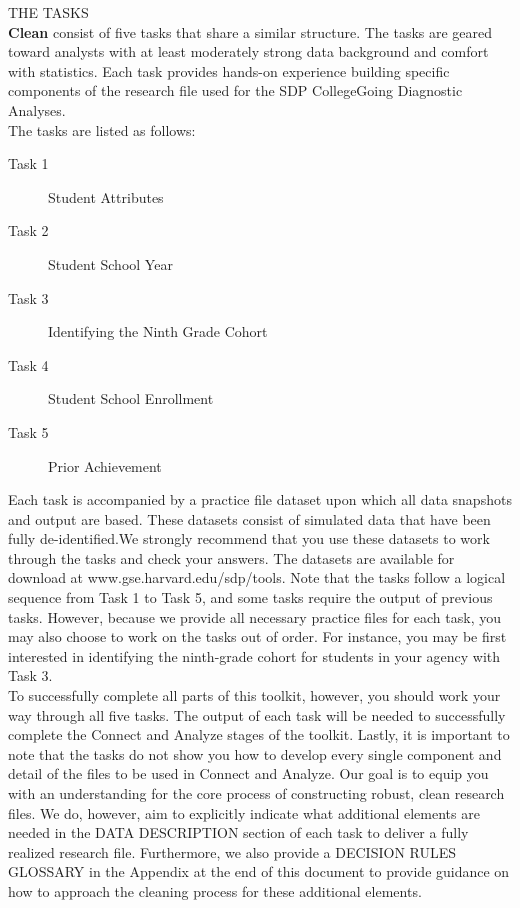 \documentclass[12pt]{article}
\begin{document}
\noindent \large{THE TASKS} \\
\normalsize
\textbf{Clean} consist of five tasks that share a similar structure.  The tasks are geared toward analysts with at least moderately 
strong data background and comfort with statistics.  Each task provides hands-on experience building specific 
components of the research file used for the SDP CollegeGoing Diagnostic Analyses.  \\
\vspace{-6pt}
\noindent The tasks are listed as follows:
\begin{description}
\item [Task 1] Student Attributes
\item [Task 2] Student School Year
\item [Task 3] Identifying the Ninth Grade Cohort
\item [Task 4] Student School Enrollment
\item [Task 5] Prior Achievement
\end{description}

Each task is accompanied by a practice file dataset upon which all data snapshots and output are based. These datasets consist of simulated data that have been fully de-identified.We strongly recommend that you use these datasets to work through the tasks and check your answers.  The datasets are available for download at www.gse.harvard.edu/sdp/tools. Note that the tasks follow a logical sequence from Task 1 to Task 5, and some tasks require the output of previous 
tasks.  However, because we provide all necessary practice files for each task, you may also choose to work on the tasks out of order.  For instance, you may be first interested in identifying the ninth-grade cohort for students in your agency with Task 3. \\

To successfully complete all parts of this toolkit, however, you should work your way through all five tasks.  The 
output of each task will be needed to successfully complete the Connect and Analyze stages of the toolkit. 
Lastly, it is important to note that the tasks do not show you how to develop every single component and detail of 
the files to be used in Connect and Analyze.  Our goal is to equip you with an understanding for the core process of 
constructing robust, clean research files.  We do, however, aim to explicitly indicate what additional elements are 
needed in the DATA DESCRIPTION section of each task to deliver a fully realized research file.  Furthermore, we also 
provide a DECISION RULES GLOSSARY in the Appendix at the end of this document to provide guidance on how 
to approach the cleaning process for these additional elements.\\ 
\end{document}
